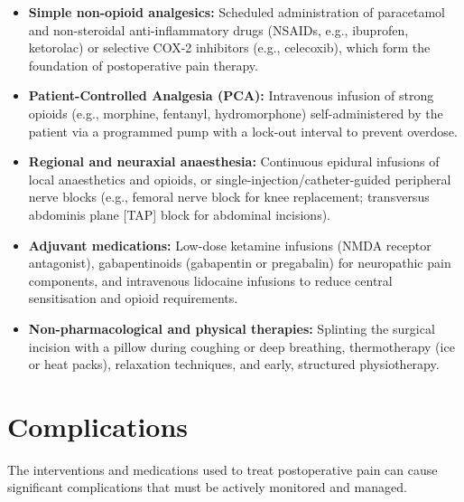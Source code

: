 \begin{itemize}
    \item \textbf{Simple non-opioid analgesics:} Scheduled administration of paracetamol and non-steroidal anti-inflammatory drugs (NSAIDs, e.g., ibuprofen, ketorolac) or selective COX-2 inhibitors (e.g., celecoxib), which form the foundation of postoperative pain therapy.
    \item \textbf{Patient-Controlled Analgesia (PCA):} Intravenous infusion of strong opioids (e.g., morphine, fentanyl, hydromorphone) self-administered by the patient via a programmed pump with a lock-out interval to prevent overdose.
    \item \textbf{Regional and neuraxial anaesthesia:} Continuous epidural infusions of local anaesthetics and opioids, or single-injection/catheter-guided peripheral nerve blocks (e.g., femoral nerve block for knee replacement; transversus abdominis plane [TAP] block for abdominal incisions).
    \item \textbf{Adjuvant medications:} Low-dose ketamine infusions (NMDA receptor antagonist), gabapentinoids (gabapentin or pregabalin) for neuropathic pain components, and intravenous lidocaine infusions to reduce central sensitisation and opioid requirements.
    \item \textbf{Non-pharmacological and physical therapies:} Splinting the surgical incision with a pillow during coughing or deep breathing, thermotherapy (ice or heat packs), relaxation techniques, and early, structured physiotherapy.
\end{itemize}

\section*{Complications}
The interventions and medications used to treat postoperative pain can cause significant complications that must be actively monitored and managed.

